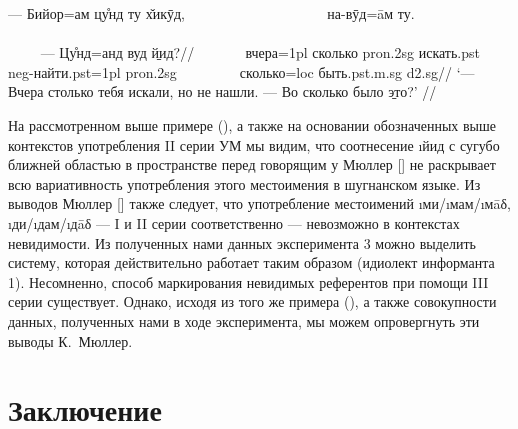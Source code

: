\begingl
\gla — Бийор=ам цу̊нд ту х̌икӯд, ~~~~~~~~~~~~~~~~~~~ на-вӯд=āм ту. ~~~~~~~~~~~~~~~~~~~~~~~~~~~~~~~~~~~~~~~~~~~~~~~~~~~~~~~~~~~~~~~~~~~~~~~~~~~~ — Цу̊нд=анд вуд \b{йид}?//
\glc ~~~~~~ вчера={\sc 1pl} сколько {\sc pron.2sg} искать.{\sc pst} ~ {\sc neg}-найти.{\sc pst=1pl} {\sc pron.2sg} ~ ~~~~~~ сколько={\sc loc} быть.{\sc pst.m.sg} {\sc d2.sg}//
\glft ‘— Вчера столько тебя искали, но не нашли. — Во сколько было \b{это}?’ //
\endgl \xe

На рассмотренном выше примере (), а также на основании обозначенных выше контекстов употребления II серии УМ мы видим, что соотнесение \i{йид} с сугубо ближней областью в пространстве перед говорящим у Мюллер [\cite*[59]{muller2015}] не раскрывает всю вариативность употребления этого местоимения в шугнанском языке. Из выводов Мюллер [\cite*[60]{muller2015}] также следует, что употребление местоимений \i{ми}/\i{мам}/\i{мāδ}, \i{ди}/\i{дам}/\i{дāδ} — I и II серии соответственно — невозможно в контекстах невидимости. Из полученных нами данных эксперимента 3 можно выделить систему, которая действительно работает таким образом (идиолект информанта 1). Несомненно, способ маркирования невидимых референтов при помощи III серии существует. Однако, исходя из того же примера (), а также совокупности данных, полученных нами в ходе эксперимента, мы можем опровергнуть эти выводы К.~Мюллер.

\section{Заключение} \label{dem-conclusion}

